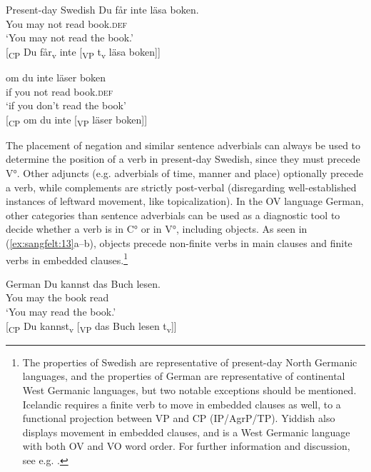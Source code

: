 \documentclass[output=paper, colorlinks, citecolor=brown]{langscibook}
\begin{document}
\ea Present-day Swedish
\label{ex:sangfelt:12}
\ea \label{ex:sangfelt:12a}
\gll Du får inte läsa boken. \\
 You may not read book.\textsc{def}\\
\glt ‘You may not read the book.’\\

[\textsubscript{CP} Du får\textsubscript{v} inte [\textsubscript{VP} t\textsubscript{v} läsa boken]]

\ex\label{ex:sangfelt:12b}
\gll om du inte läser boken \\ 
 if you not read book.\textsc{def}\\
\glt ‘if you don’t read the book’\\

[\textsubscript{CP} om du inte [\textsubscript{VP} läser boken]]
\z 
\z 

The placement of negation and similar sentence adverbials can always be used to determine the position of a verb in present-day Swedish, since they must precede V°. Other adjuncts (e.g. adverbials of time, manner and place) optionally precede a verb, while complements are strictly post-verbal (disregarding well-established instances of leftward movement, like topicalization). In the OV language German, other categories than sentence adverbials can be used as a diagnostic tool to decide whether a verb is in C° or in V°, including objects. As seen in (\ref{ex:sangfelt:13}a–b), objects precede non-finite verbs in main clauses and finite verbs in embedded clauses.\footnote{The properties of Swedish are representative of present-day North Germanic languages, and the properties of German are representative of continental West Germanic languages, but two notable exceptions should be mentioned. Icelandic requires a finite verb to move in embedded clauses as well, to a functional projection between VP and CP (IP/AgrP/TP). Yiddish also displays movement in embedded clauses, and is a West Germanic language with both OV and VO word order. For further information and discussion, see e.g. \citet[3–18]{Vikner2001}.}

\ea German\label{ex:sangfelt:13}
\ea\label{ex:sangfelt:13a}
\gll Du kannst das Buch lesen.\\
 You may the book read\\
\glt ‘You may read the book.’\\

[\textsubscript{CP} Du kannst\textsubscript{v} [\textsubscript{VP} {das} {Buch} lesen t\textsubscript{v}]]
\end{document}

